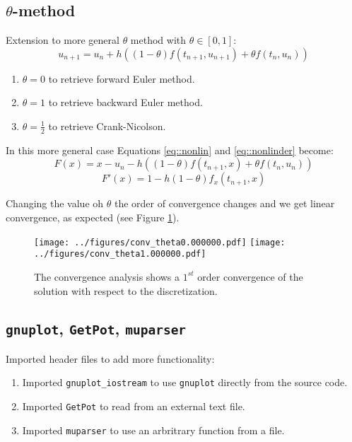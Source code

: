 \documentclass[]{article}
\begin{document}
\subsection{$\theta$-method}

Extension to more general $\theta$ method with $\theta \in [0,1]$:
$$u_{n+1} = u_n + h \left( (1-\theta) f(t_{n+1},u_{n+1}) + \theta f(t_{n},u_{n})  \right) $$

\begin{enumerate}
\item $\theta = 0$ to retrieve forward Euler method.
\item $\theta = 1$ to retrieve backward Euler method.
\item $\theta = \frac{1}{2}$ to retrieve Crank-Nicolson.
\end{enumerate}
In this more general case Equations \ref{eq::nonlin} and \ref{eq::nonlinder} become:
$$F(x) = x - u_n - h \left( (1-\theta) f(t_{n+1}, x) + \theta f(t_{n},u_{n})  \right) $$ 
$$F'(x) = 1 - h (1-\theta) f_x(t_{n+1}, x)  $$ 

Changing the value oh $\theta$ the order of convergence changes and we get linear convergence, as expected (see Figure \ref{fig::order1}).

\begin{figure}[h!]
	\centering
	\texttt{[image: ../figures/conv\_theta0.000000.pdf]} \hfill
	\texttt{[image: ../figures/conv\_theta1.000000.pdf]}
	\caption{The convergence analysis shows a $1^{st}$ order convergence of the solution with respect to the discretization.}
	\label{fig::order1}
\end{figure}

\newpage

\subsection{\texttt{gnuplot}, \texttt{GetPot}, \texttt{muparser}}

Imported header files to add more functionality:
\begin{enumerate}
	\item  Imported \texttt{gnuplot\_iostream} to use \texttt{gnuplot} directly from the source code. 
	\item Imported \texttt{GetPot} to read from an external text  file. 
	\item Imported \texttt{muparser} to use an arbritrary function from a file. 
\end{enumerate}
\end{document}

